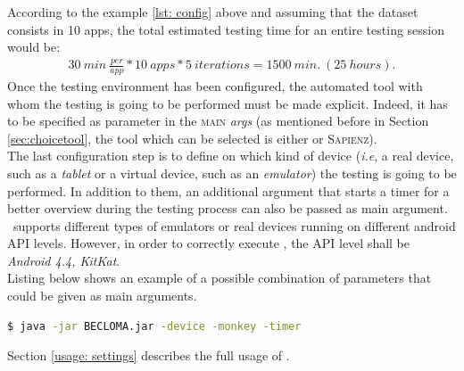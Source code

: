 According to the example \ref{lst: config} above and assuming that the dataset consists in 10 apps, the total estimated testing time for an entire testing session would be: 
\begin{align*}
30 \:min \: \frac{per}{app} * 10\: apps * 5\: iterations = 1500 \:min. \:(25\: hours). 
\end{align*}
Once the testing environment has been configured, the automated tool with whom the testing is going to be performed must be made explicit. 
Indeed, it has to be specified as parameter in the \textsc{main} \textit{args} (as mentioned before in Section \ref{sec:choicetool}, the tool which can be selected is either \monkey or \textsc{Sapienz}). \\
The last configuration step is to define on which kind of device (\textit{i.e}, a real device, such as a \textit{tablet} or a virtual device, such as an \textit{emulator}) the testing is going to be performed. In addition to them, an additional argument that starts a timer for a better overview during the testing process can also be passed as main argument. \toolname\ supports different types of emulators or real devices running on different android API levels. However, in order to correctly execute \sapienz, the API level shall be \textit{Android 4.4, KitKat}. \\
Listing below shows an example of a possible combination of parameters that could be given as main arguments. 
\begin{lstlisting}[caption=Possible \toolname\ command-line, language=bash]
$ java -jar BECLOMA.jar -device -monkey -timer
\end{lstlisting}
Section \ref{usage: settings} describes the full usage of \toolname. 

